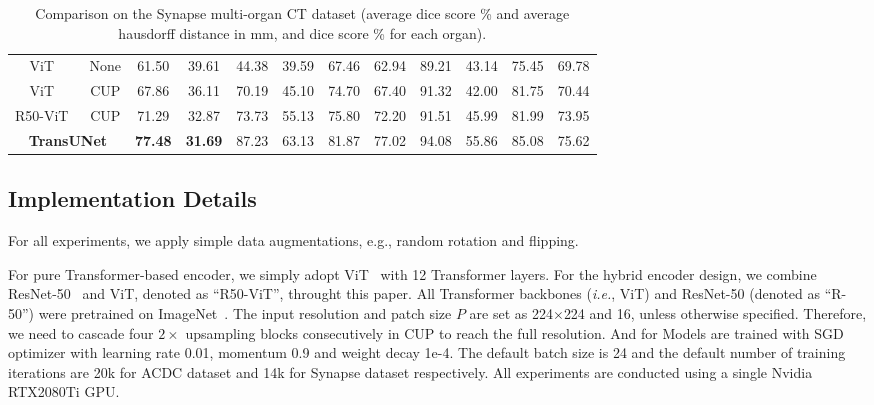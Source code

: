 \documentclass[runningheads]{llncs}
\begin{document}
\begin{table}[]
{\begin{tabular}{cccccccccccc}
ViT~\cite{dosovitskiy2020image}    & None                 & 61.50        & 39.61        & 44.38      & 39.59          & 67.46         & 62.94          & 89.21       & 43.14       & 75.45       & 69.78        \\
ViT~\cite{dosovitskiy2020image}        & CUP              & 67.86        & 36.11        & 70.19      & 45.10          & 74.70         & 67.40         & 91.32       & 42.00        & 81.75       & 70.44       \\
R50-ViT~\cite{dosovitskiy2020image}    & CUP              & 71.29        & 32.87        & 73.73      & 55.13          & 75.80         & 72.20         & 91.51       & 45.99        & 81.99      & 73.95        \\
\multicolumn{2}{c}{\textbf{TransUNet}} & \textbf{77.48}        & \textbf{31.69}        & 87.23        & 63.13          & 81.87          & 77.02          & 94.08      & 55.86         & 85.08      & 75.62        \\ 
\hline
\end{tabular}
\vspace{-0.6em}
}
\caption{Comparison on the Synapse multi-organ CT dataset (average dice score \% and average hausdorff distance in mm, and dice score \% for each organ).
}
\label{tab:synapse}
\end{table}

\vspace{-2.5em}
\subsection{Implementation Details}
For all experiments, we apply simple data augmentations, e.g., random rotation and flipping. 

For pure Transformer-based encoder, we simply adopt ViT~\cite{dosovitskiy2020image} with 12 Transformer layers.
For the hybrid encoder design, we combine ResNet-50~\cite{he2016deep} and ViT, denoted as ``R50-ViT'', throught this paper.
All Transformer backbones (\emph{i.e.}, ViT) and ResNet-50 (denoted as ``R-50'') were pretrained on ImageNet~\cite{deng2009imagenet}. 
The input resolution and patch size $P$ are set as 224$\times$224 and 16, unless otherwise specified.
Therefore, we need to cascade four $2 \times$ upsampling blocks consecutively in CUP to reach the full resolution.
And for 
Models are trained with SGD optimizer with learning rate 0.01, momentum 0.9 and weight decay 1e-4.
The default batch size is 24 and the default number of training iterations are 20k for ACDC dataset and 14k for Synapse dataset respectively. All experiments are conducted using a single Nvidia RTX2080Ti GPU.
\end{document}
